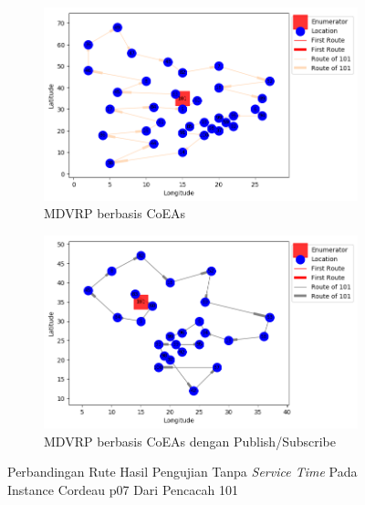 \begin{figure}[H]
	\centering
	\begin{subfigure}[t]{\textwidth}
		\centering
		\includegraphics[width=\textwidth]{Resources/Images/cordeau_p07/cordeau_p07_notw_101_coes}
		\caption{MDVRP berbasis CoEAs}
		\label{fig:cordeau_p07_notw_101_coes}
	\end{subfigure}
	\begin{subfigure}[t]{\textwidth}
		\centering
		\includegraphics[width=\textwidth]{Resources/Images/cordeau_p07/cordeau_p07_notw_101_pubsub_coes}
		\caption{MDVRP berbasis CoEAs dengan Publish/Subscribe}
		\label{fig:cordeau_p07_notw_101_pubsub_coes}
	\end{subfigure}
	\caption{Perbandingan Rute Hasil Pengujian Tanpa \textit{Service Time} Pada Instance Cordeau p07 Dari Pencacah 101}
	\label{fig:cordeau_p07_notw_101}
\end{figure}


